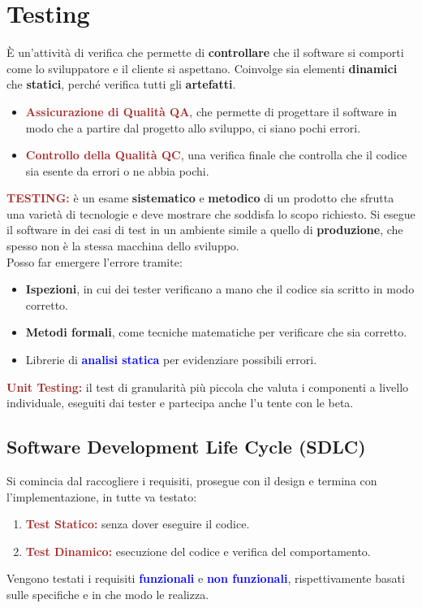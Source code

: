 \chapter{Testing}
È un'attività di verifica che permette di \textbf{controllare} che il software si comporti come lo sviluppatore e il cliente si aspettano. Coinvolge sia elementi \textbf{dinamici} che \textbf{statici}, perché verifica tutti gli \textbf{artefatti}.
\begin{itemize}
    \item  \textbf{\textcolor{brown}{Assicurazione di Qualità QA}}, che permette di progettare il software in modo che a partire dal progetto allo sviluppo, ci siano pochi errori.
    \item \textbf{\textcolor{brown}{Controllo della Qualità QC}}, una verifica finale che controlla che il codice sia esente da errori o ne abbia pochi.
\end{itemize}

\begin{boxDef}
\textbf{\textcolor{brown}{TESTING:}} è un esame \textbf{sistematico} e \textbf{metodico} di un prodotto che sfrutta una varietà di tecnologie e deve mostrare che soddisfa lo scopo richiesto. Si esegue il software in dei casi di test in un ambiente simile a quello di \textbf{produzione}, che spesso non è la stessa macchina dello sviluppo. \\
Posso far emergere l'errore tramite:
\begin{itemize}
    \item \textbf{Ispezioni}, in cui dei tester verificano a mano che il codice sia scritto in modo corretto.
    \item \textbf{Metodi formali}, come tecniche matematiche per verificare che sia corretto.
    \item Librerie di \textbf{\textcolor{blue}{analisi statica}} per evidenziare possibili errori.
\end{itemize}
\textbf{\textcolor{brown}{Unit Testing:}} il test di granularità più piccola che valuta i componenti a livello individuale, eseguiti dai tester e partecipa anche l'u tente con le beta.
\end{boxDef}

\section{Software Development Life Cycle (SDLC)}
Si comincia dal raccogliere i requisiti, prosegue con il design e termina con l'implementazione, in tutte va testato:
\begin{enumerate}
    \item \textbf{\textcolor{brown}{Test Statico:}} senza dover eseguire il codice.
    \item \textbf{\textcolor{brown}{Test Dinamico:}} esecuzione del codice e verifica del comportamento.
\end{enumerate}
Vengono testati i requisiti \textbf{\textcolor{blue}{funzionali}} e \textbf{\textcolor{blue}{non funzionali}}, rispettivamente basati sulle specifiche e in che modo le realizza.

